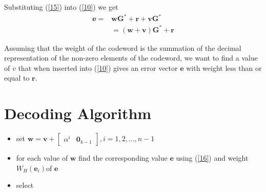\documentclass[fontsize=12pt]{article}
\begin{document}
Substituting (\ref{15}) into (\ref{10}) we get
\begin{equation}
\begin{split}
\mathbf{e}=& \mathbf{w}\mathbf{G}^{*} + \mathbf{r}+\mathbf{v}\mathbf{G}^{*}\\
&= (\mathbf{w}+\mathbf{v})\mathbf{G}^{*} + \mathbf{r}
\end{split}
\label{16}
\end{equation}

Assuming that the weight of the codeword is the summation of the decimal
representation of the  non-zero elements of the codeword, we want to find a value of $v$
that when inserted into (\ref{10}) gives an error vector $\mathbf{e}$ with weight less
than or equal to $\mathbf{r}$. 

\section{Decoding Algorithm}
\begin{itemize}
\item set  $\mathbf{w}= \mathbf{v}+\begin{bmatrix} \alpha^{i}& \mathbf{0}_{k-1} \end{bmatrix}
, i=1,2,...,n-1$
\item for each value of $\mathbf{w}$ find the corresponding value $\mathbf{e}$ 
using (\ref{16}) and
weight $W_H(\mathbf{e}_i)$of $\mathbf{e}$
\item select 
\end{itemize}
\end{document}
